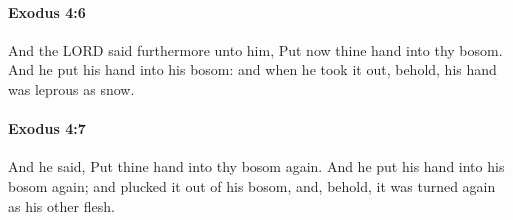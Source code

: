 		\paragraph{Exodus 4:6} %
			\label{EXODUS-4-6}

			And the LORD said furthermore unto him, Put now thine hand into thy bosom. And he put his hand into his bosom: and when he took it out, behold, his hand was leprous as snow.


		\paragraph{Exodus 4:7} %
			\label{EXODUS-4-7}

			And he said, Put thine hand into thy bosom again. And he put his hand into his bosom again; and plucked it out of his bosom, and, behold, it was turned again as his other flesh.


